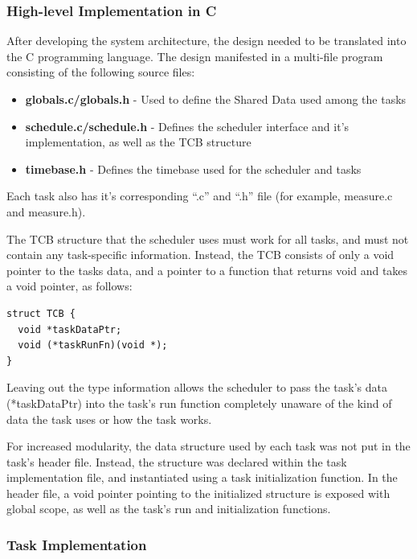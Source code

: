\documentclass[12pt]{article} %
\begin{document}
\subsubsection{High-level Implementation in C}
After developing the system architecture, the design needed to be translated into the C programming language.  The design manifested in a multi-file program consisting of the following source files:
\begin{itemize}
  \item \textbf{globals.c/globals.h} - Used to define the Shared Data used among the tasks
  \item \textbf{schedule.c/schedule.h} - Defines the scheduler interface and it's implementation, as well as the TCB structure
  \item \textbf{timebase.h} - Defines the timebase used for the scheduler and tasks
\end{itemize}
Each task also has it's corresponding ``.c'' and ``.h'' file (for example, measure.c and measure.h).

The TCB structure that the scheduler uses must work for all tasks, and must not
contain any task-specific information.  Instead, the TCB consists of only a void pointer to the tasks data, and a pointer to a function that returns void and takes a void pointer, as follows:
\begin{lstlisting}
struct TCB {
  void *taskDataPtr;
  void (*taskRunFn)(void *);
}
\end{lstlisting}
Leaving out the type information allows the scheduler to pass the task's data
(*taskDataPtr) into the task's run function completely unaware of the kind of
data the task uses or how the task works.

For increased modularity, the data structure used by each task was not put in
the task's header file.  Instead, the structure was declared within the task
implementation file, and instantiated using a task initialization function.  In
the header file, a void pointer pointing to the initialized structure is
exposed with global scope, as well as the task's run and initialization functions.

\subsubsection{Task Implementation}
\end{document}
